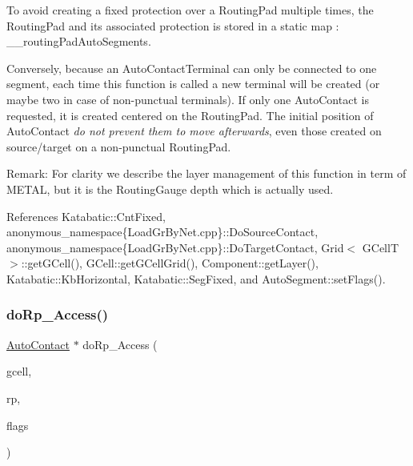 To avoid creating a fixed protection over a Routing\+Pad multiple times, the Routing\+Pad and it\textquotesingle{}s associated protection is stored in a static {\ttfamily map} \+: {\ttfamily \+\_\+\+\_\+routing\+Pad\+Auto\+Segments}.

Conversely, because an Auto\+Contact\+Terminal can only be connected to one segment, each time this function is called a new terminal will be created (or maybe two in case of non-\/punctual terminals). If only one Auto\+Contact is requested, it is created centered on the Routing\+Pad. The initial position of Auto\+Contact {\itshape do not prevent them to move afterwards}, even those created on source/target on a non-\/punctual Routing\+Pad.

\begin{DoxyParagraph}{Remark\+:}
For clarity we describe the layer management of this function in term of {\ttfamily M\+E\+T\+AL}, but it is the Routing\+Gauge depth which is actually used.
\end{DoxyParagraph}
 

References Katabatic\+::\+Cnt\+Fixed, anonymous\+\_\+namespace\{\+Load\+Gr\+By\+Net.\+cpp\}\+::\+Do\+Source\+Contact, anonymous\+\_\+namespace\{\+Load\+Gr\+By\+Net.\+cpp\}\+::\+Do\+Target\+Contact, Grid$<$ G\+Cell\+T $>$\+::get\+G\+Cell(), G\+Cell\+::get\+G\+Cell\+Grid(), Component\+::get\+Layer(), Katabatic\+::\+Kb\+Horizontal, Katabatic\+::\+Seg\+Fixed, and Auto\+Segment\+::set\+Flags().

\mbox{\label{group__LoadGlobalRouting_gada6d3c694b8d741b6504b7c3da166357}} 
\subsubsection{\texorpdfstring{do\+Rp\+\_\+\+Access()}{doRp\_Access()}}
{\footnotesize\ttfamily \hyperlink{classKatabatic_1_1AutoContact}{Auto\+Contact} $\ast$ do\+Rp\+\_\+\+Access (\begin{DoxyParamCaption}\item[{\hyperlink{classKatabatic_1_1GCell}{G\+Cell} $\ast$}]{gcell,  }\item[{\textbf{ Component} $\ast$}]{rp,  }\item[{unsigned int}]{flags }\end{DoxyParamCaption})\hspace{0.3cm}{\ttfamily [static]}}


